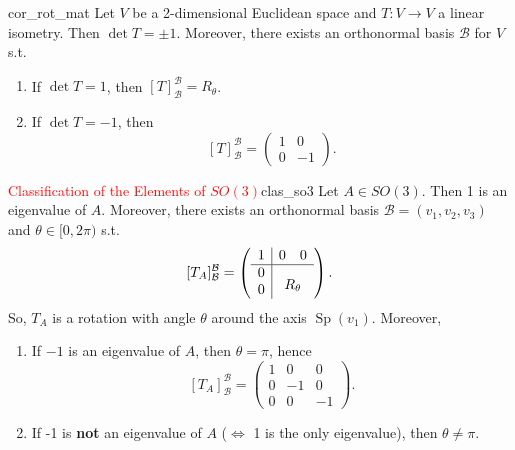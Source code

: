 \begin{corollary}{}{cor_rot_mat}
	Let $V$ be a 2-dimensional Euclidean space and $T:V \to V$ a linear isometry. Then $\det T = \pm 1$. Moreover, there exists an orthonormal basis $\mathcal{B}$ for $V$ s.t.
	\begin{enumerate}
		\item If $\det T = 1$, then $[T]^{\mathcal{B}}_{\mathcal{B}} = R_{\theta}$.
		\item If $\det T = -1$, then
		\[
			[T]^{\mathcal{B}}_{\mathcal{B}} = \begin{pmatrix}
				1 & 0 \\
				0 & -1
			\end{pmatrix}.
		\]
	\end{enumerate}
\end{corollary}

\begin{proposition}{\textcolor{red}{Classification of the Elements of $SO(3)$}}{clas_so3}
	Let $A \in SO(3)$. Then 1 is an eigenvalue of $A$. Moreover, there exists an orthonormal basis $\mathcal{B} = (v_1, v_2, v_3)$ and $\theta \in [0, 2\pi)$ s.t.
	\[
		[T_A]^{\mathcal{B}}_{\mathcal{B}} = 
		\left(
		\begin{array}{c|cc}
			1 & 0 & 0 \\
			\hline
			0 & \multicolumn{2}{c}{\smash{\lower2ex\hbox{$R_\theta$}}} \\
			0 & & 
		\end{array}
		\right).
	\]
	So, $T_A$ is a rotation with angle $\theta$ around the axis $\operatorname{Sp}(v_1)$. Moreover,
	\begin{enumerate}
		\item[(a)] If $-1$ is an eigenvalue of $A$, then $\theta = \pi$, hence
		\[
			[T_A]^{\mathcal{B}}_{\mathcal{B}} = \begin{pmatrix}
				1 & 0& 0\\
				0 & -1 & 0\\
				0 & 0 & -1
			\end{pmatrix}.
		\]
		\item[(b)] If -1 is \textbf{not} an eigenvalue of $A$ ($\Longleftrightarrow$ 1 is the only eigenvalue), then $\theta \neq \pi$.
	\end{enumerate}
\end{proposition}

